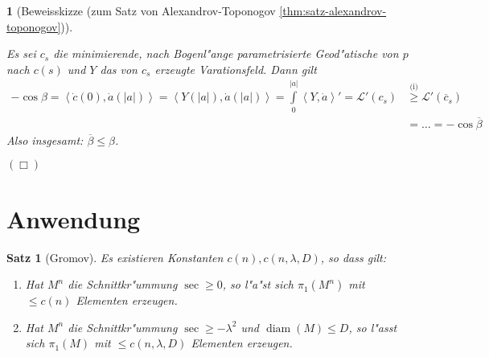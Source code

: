 \documentclass[paper=A4, twoside, chapterprefix=true, bibliography=totoc, headsepline]{scrbook}
\DeclareMathOperator{\diam}{diam} %
\theoremstyle{plain}
\newtheorem{Satz}[Dfn]{Satz}
\theoremstyle{nonumberplain}
\theoremstyle{empty}
\newtheorem{emptythm}{}%
\theoremstyle{break}
\begin{document}
\begin{emptythm}[Beweisskizze (zum Satz von Alexandrov-Toponogov \ref{thm:satz-alexandrov-toponogov})]
\begin{enumerate}[label=(\roman*),leftmargin=*,widest=ii]
\begin{center}
\end{center}
	Es sei $c_s$ die minimierende, nach Bogenl"ange parametrisierte Geod"atische von $p$ nach $c(s)$ und $Y$ das von $c_s$ erzeugte Varationsfeld.
	Dann gilt
	\begin{align*}
		- \cos \beta  = \left<\dot c(0), \dot a(|a|)\right> 
		= \left<Y(|a|), \dot a(|a|) \right>
		= \int\limits_0^{|a|} \left<Y, \dot a\right>'
		= \mathcal L'(c_s)
		&\overset{\text{(i)}}{\geq} \mathcal L'(\overline c_s)\\
		& = \ldots = -\cos \overline \beta
	\end{align*}
	Also insgesamt: $\overline \beta \leq \beta$.
\end{enumerate}
\hfill\ensuremath{(\Box)}
\end{emptythm}


\section{Anwendung}

\begin{Satz}[Gromov]
  Es existieren Konstanten $c(n), c(n,\lambda,D)$, so dass gilt:
  \begin{enumerate}[label=(\roman*)]
  \item Hat $M^n$ die Schnittkr"ummung $\sec \geq 0$, so l"a"st sich $\pi_1(M^n)$ mit $\leq c(n)$ Elementen erzeugen.
  \item Hat $M^n$ die Schnittkr"ummung $\sec \geq - \lambda^2$ und $\diam(M) \leq D$, so l"asst sich $\pi_1(M)$ mit $\leq c(n,\lambda,D)$ Elementen erzeugen.
  \end{enumerate}
\end{Satz}
\end{document}

